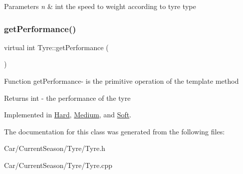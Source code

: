 \begin{DoxyParams}{Parameters}
{\em n} & int the speed to weight according to tyre type \\
\hline
\end{DoxyParams}
\mbox{\label{classTyre_a039a0e53d35fb8bb9301e05b13af1478}} 
\subsubsection{\texorpdfstring{get\+Performance()}{getPerformance()}}
{\footnotesize\ttfamily virtual int Tyre\+::get\+Performance (\begin{DoxyParamCaption}{ }\end{DoxyParamCaption})\hspace{0.3cm}{\ttfamily [pure virtual]}}

Function get\+Performance-\/ is the primitive operation of the template method \begin{DoxyReturn}{Returns}
int -\/ the performance of the tyre 
\end{DoxyReturn}


Implemented in \hyperlink{classHard_a0efda977538c97c69d69a81b5f526b59}{Hard}, \hyperlink{classMedium_aad3fd641f9ed28ce18067291e9c51151}{Medium}, and \hyperlink{classSoft_af95cbbd4a3dc573edc5a6eaae725932f}{Soft}.



The documentation for this class was generated from the following files\+:\begin{DoxyCompactItemize}
\item 
Car/\+Current\+Season/\+Tyre/Tyre.\+h\item 
Car/\+Current\+Season/\+Tyre/Tyre.\+cpp\end{DoxyCompactItemize}
